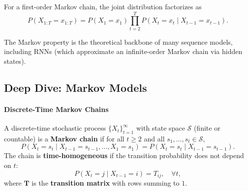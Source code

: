 \documentclass{tufte-handout}
\begin{document}
\begin{thm}
    For a first-order Markov chain, the joint distribution factorizes as
    \[
    P(X_{1:T} = x_{1:T}) = P(X_1 = x_1) \prod_{t=2}^{T} P(X_t = x_t \mid X_{t-1} = x_{t-1}).
    \]
\end{thm}

The Markov property is the theoretical backbone of many sequence models, including RNNs (which approximate an infinite-order Markov chain via hidden states).

\subsection{Deep Dive: Markov Models}

\paragraph{Discrete-Time Markov Chains}
A discrete-time stochastic process $\{X_t\}_{t=1}^\infty$ with state space $\mathcal{S}$ (finite or countable) is a \textbf{Markov chain} if for all $t \ge 2$ and all $s_1,\dots,s_t \in \mathcal{S}$,
\[
P(X_t = s_t \mid X_{t-1}=s_{t-1}, \dots, X_1=s_1) = P(X_t = s_t \mid X_{t-1}=s_{t-1}).
\]
The chain is \textbf{time-homogeneous} if the transition probability does not depend on $t$:
\[
P(X_t = j \mid X_{t-1}=i) = T_{ij}, \quad \forall t,
\]
where $\mathbf{T}$ is the \textbf{transition matrix} with rows summing to $1$.

\begin{marginfigure}
\centering
\caption{A three-state Markov chain with transition probabilities.}
\label{fig:markov_chain}
\end{marginfigure}
\end{document}
